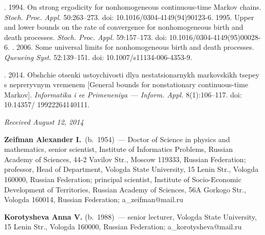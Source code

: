 {\begin{multicols}{2}
{{\begin{thebibliography}{99}
. 1994. On strong ergodicity for
nonhomogeneous continuous-time Markov chains. \textit{Stoch. Proc. Appl.} 50:263--273.
doi: 10.1016/0304-4149(94)90123-6.
 1995. Upper and lower bounds on the rate
of convergence for nonhomogeneous birth and death processes.
\textit{Stoch. Proc. Appl.} 59:157--173.
doi: 10.1016/0304-4149(95)00028-6.
. 2006.
Some universal limits for nonhomogeneous birth and death processes.
\textit{Queueing Syst.} 52:139--151.
doi: 10.1007/s11134-006-4353-9.


.
2014. Obshchie otsenki ustoychivosti dlya nestatsionarnykh markovskikh tsepey s
nepreryvnym vremenem [General bounds for nonstationary continuous-time Markov].
\textit{Informatika i ee Primeneniya}~--- \textit{Inform. Appl.} 8(1):106--117.
doi: 10.14357/ 19922264140111.

\end{thebibliography}

 }
 }

\end{multicols}

\vspace*{-6pt}

\hfill{\small\textit{Received August 12, 2014}}

\vspace*{-18pt}

\Contr

\noindent
\textbf{Zeifman Alexander I.}\ (b.\ 1954)~--- Doctor of Science in
physics and mathematics,
senior scientist, Institute of Informatics Problems,
Russian Academy of Sciences, 44-2 Vavilov Str., Moscow 119333,
Russian Federation;  professor, Head of Department,
Vologda State University, 15 Lenin Str., Vologda 160000, Russian Federation;
principal scientist, Institute of Socio-Economic Development of Territories,
Russian Academy of Sciences,
56A Gorkogo Str., Vologda 160014, Russian Federation; a\_zeifman@mail.ru


\vspace*{3pt}


\noindent
\textbf{Korotysheva Anna V.} (b.\ 1988)~--- senior lecturer, Vologda State  University,
15 Lenin Str., Vologda 160000, Russian Federation;
a\_korotysheva@mail.ru


\vspace*{3pt}


}
